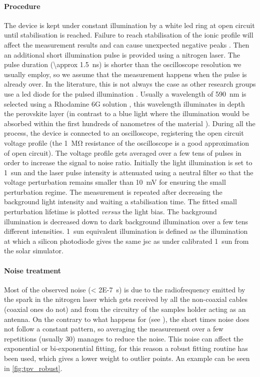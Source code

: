 	\paragraph{Procedure}
	The device is kept under constant illumination by a white \gls{led} ring at open circuit until stabilisation is reached.
	Failure to reach stabilisation of the ionic profile will affect the measurement results \cite{ORegan2015b} and can cause unexpected negative  peaks \cite{Calado2016}.
	Then an additional short illumination pulse is provided using a nitrogen laser.
	The pulse duration (\SI{\approx 1.5}{\ns}) is shorter than the oscilloscope resolution we usually employ, so we assume that the measurement happens when the pulse is already over.
	In the literature, this is not always the case as other research groups use a \gls{led} diode for the pulsed illumination \cite{Calado2016}.
	Usually a wavelength of \SI{590}{\nm} is selected using a Rhodamine 6G solution \cite{RadiantDyesLaser}, this wavelength illuminates in depth the perovskite layer (in contrast to a blue light where the illumination would be absorbed within the first hundreds of nanometres of the material \cite{Bi2016,Tress2016}).
	During all the process, the device is connected to an oscilloscope, registering the open circuit voltage profile (the \SI{1}{\Mohm} resistance of the oscilloscope is a good approximation of open circuit).
	The voltage profile gets averaged over a few tens of pulses in order to increase the signal to noise ratio.
	Initially the light illumination is set to \SI{1}{sun} and the laser pulse intensity is attenuated using a neutral filter so that the voltage perturbation remains smaller than \SI{10}{\mV} for ensuring the small perturbation regime.
	The measurement is repeated after decreasing the background light intensity and waiting a stabilisation time.
	The fitted small perturbation lifetime is plotted \textsl{versus} the light bias.
	The background illumination is decreased down to dark background illumination over a few tens different intensities.
	1~sun equivalent illumination is defined as the illumination at which a silicon photodiode gives the same \gls{jsc} as under calibrated 1~sun from the solar simulator.

	\paragraph{Noise treatment}\label{tpv_robust}
	Most of the observed noise (\SI{< 2E-7}{\s}) is due to the radiofrequency emitted by the spark in the nitrogen laser which gets received by all the non\hyp{}coaxial cables (coaxial ones do not) and from the circuitry of the samples holder acting as an antenna.
	On the contrary to what happens for  (see ), the short times noise does not follow a constant pattern, so averaging the measurement over a few repetitions (usually 30) manages to reduce the noise.
	This noise can affect the exponential or bi\hyp{}exponential fitting, for this reason a robust fitting routine has been used, which gives a lower weight to outlier points.
	An example can be seen in \cref{fig:tpv_robust}.

